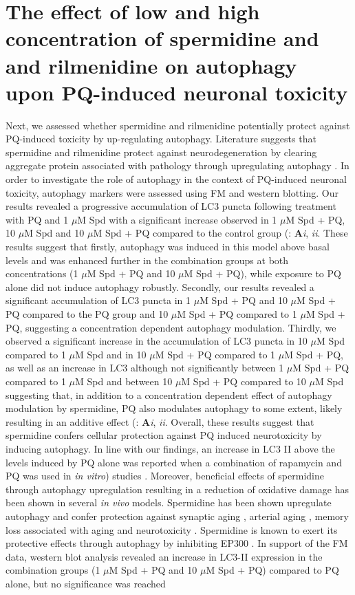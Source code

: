 \section{The effect of low and high concentration of spermidine and and rilmenidine on autophagy upon PQ-induced neuronal toxicity}
Next, we assessed whether spermidine and rilmenidine potentially protect against PQ-induced toxicity by up-regulating autophagy. Literature suggests that spermidine and rilmenidine protect against neurodegeneration by clearing aggregate protein associated with pathology through upregulating autophagy \citep{Buttner2014,Rose2010}. In order to investigate the role of autophagy in the context of PQ-induced neuronal toxicity, autophagy markers were assessed using FM and western blotting. Our results revealed a progressive accumulation of LC3 puncta following treatment with PQ and 1 $\mu$M Spd with a significant increase observed in 1 $\mu$M Spd + PQ, 10 $\mu$M Spd and 10 $\mu$M Spd + PQ compared to the control group (: \textbf{A}\textit{i}, \textit{ii}. These results suggest that firstly, autophagy was induced in this model above basal levels and was enhanced further in the combination groups at both concentrations (1 $\mu$M Spd + PQ and 10 $\mu$M Spd + PQ), while exposure to PQ alone did not induce autophagy robustly. Secondly, our results revealed a significant accumulation of LC3 puncta in 1 $\mu$M Spd + PQ and 10 $\mu$M Spd + PQ compared to the PQ group and 10 $\mu$M Spd + PQ compared to 1 $\mu$M Spd + PQ, suggesting a concentration dependent autophagy modulation. Thirdly, we observed a significant increase in the accumulation of LC3 puncta in 10 $\mu$M Spd compared to 1 $\mu$M Spd and in 10 $\mu$M Spd + PQ compared to 1 $\mu$M Spd + PQ, as well as an increase in LC3 although not significantly between 1 $\mu$M Spd + PQ compared to 1 $\mu$M Spd  and between 10 $\mu$M Spd + PQ compared to 10 $\mu$M Spd suggesting that, in addition to a concentration dependent effect of autophagy modulation by spermidine, PQ also modulates autophagy to some extent, likely resulting in an additive effect (: \textbf{A}\textit{i}, \textit{ii}. Overall, these results suggest that spermidine confers cellular protection against PQ induced neurotoxicity by inducing autophagy. In line with our findings, an increase in LC3 II above the levels induced by PQ alone was reported when a combination of rapamycin and PQ was used in \textit{in vitro}) studies \citep{Gonzalez-Polo2007a}. Moreover, beneficial effects of spermidine through autophagy upregulation resulting in a reduction of oxidative damage has been shown in several  \textit{in vivo} models. Spermidine has been shown upregulate autophagy and confer protection against synaptic aging \citep{Bhukel2017}, arterial aging \citep{LaRocca2013}, memory loss associated with aging \citep{Gupta2013,Sigrist2014,Wirth2018} and neurotoxicity \citep{Buttner2014,Yang2017}. Spermidine is known to exert its protective effects through autophagy by inhibiting EP300 \citep{Pietrocola2015}. In support of the FM data, western blot analysis revealed an increase in LC3-II expression in the combination groups (1 $\mu$M Spd + PQ and 10 $\mu$M Spd + PQ) compared to PQ alone, but no significance was reached  